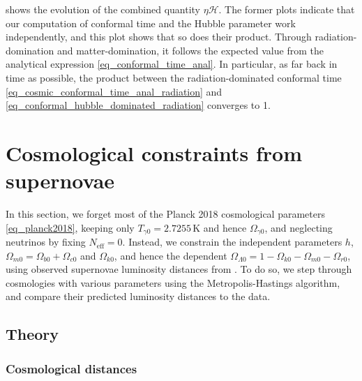\documentclass[10pt,a4paper]{article}
\begin{document}
 shows the evolution of the combined quantity $\eta \mathcal{H}$.
The former plots indicate that our computation of conformal time and the Hubble parameter work independently,
and this plot shows that so does their product.
Through radiation-domination and matter-domination, it follows the expected value from the analytical expression \eqref{eq_conformal_time_anal}.
In particular, as far back in time as possible, the product between the radiation-dominated conformal time \eqref{eq_cosmic_conformal_time_anal_radiation}
and \eqref{eq_conformal_hubble_dominated_radiation} converges to 1.

\clearpage

\section{Cosmological constraints from supernovae}
\label{sec_supernova}

In this section, we forget most of the Planck 2018 cosmological parameters \eqref{eq_planck2018},
keeping only $T_{\gamma0}=2.7255\,\mathrm{K}$ and hence $\Omega_{\gamma0}$,
and neglecting neutrinos by fixing $N_\text{eff}=0$.
Instead, we constrain the independent parameters $h$, $\Omega_{m0}=\Omega_{b0}+\Omega_{c0}$ and $\Omega_{k0}$,
and hence the dependent $\Omega_{\Lambda 0}=1-\Omega_{k0}-\Omega_{m0}-\Omega_{r0}$,
using observed supernovae luminosity distances from \cite{betouleImprovedCosmologicalConstraints2014}.
To do so, we step through cosmologies with various parameters using the Metropolis-Hastings algorithm,
and compare their predicted luminosity distances to the data.

\subsection{Theory}

\subsubsection{Cosmological distances}
\end{document}

